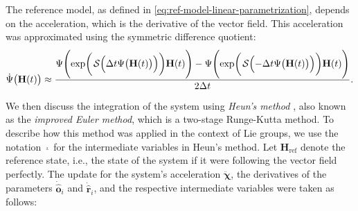 The reference model, as defined in \eqref{eq:ref-model-linear-parametrization}, depends on the acceleration, which is the derivative of the vector field. This acceleration was approximated using the symmetric difference quotient: 
\begin{align}
    \dot{\Psi}\bigl(\mathbf{H}(t)\bigr) \approx \frac{\Psi\Biggl(\exp\biggl(\SL\Bigl(\Delta t\Psi\bigl(\mathbf{H}(t)\bigr)\Bigr)\biggr)\mathbf{H}(t)\Biggr) - \Psi\Biggl(\exp\biggl(\SL\Bigl(-\Delta t\Psi\bigl(\mathbf{H}(t)\bigr)\Bigr)\biggr)\mathbf{H}(t)\Biggr)}{2\Delta t}. \label{eq:approximation-derivative-psi}
\end{align}

We then discuss the integration of the system using \emph{Heun's method} \citep[p. 330]{fred2007algoritmos}, also known as the \emph{improved Euler method}, which is a two-stage Runge-Kutta method. To describe how this method was applied in the context of Lie groups, we use the notation $\underline{\cdot}$ for the intermediate variables in Heun's method. Let $\mathbf{H}_\text{ref}$ denote the reference state, i.e., the state of the system if it were following the vector field perfectly. The update for the system's acceleration $\ddot{\boldsymbol{\chi}}$, the derivatives of the parameters $\dot{\widehat{\mathbf{o}}}_i$ and $\dot{\widehat{\mathbf{r}}}_i$, and the respective intermediate variables were taken as follows:
